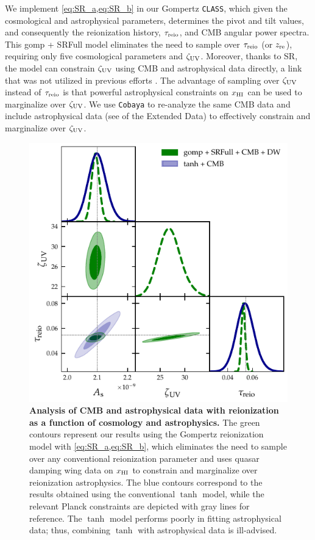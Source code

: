 We implement \cref{eq:SR_a,eq:SR_b} in our Gompertz \texttt{CLASS},
which given the cosmological and astrophysical parameters, determines
the pivot and tilt values, and consequently the reionization history,
$\tau_{\mathrm{reio}}$, and CMB angular power spectra.
This gomp + SRFull model eliminates the need to sample over $\tau_{\mathrm{reio}}$
(or $z_{\mathrm{re}}$), requiring only five cosmological parameters and $\zeta_\mathrm{UV}$.
Moreover, thanks to SR, the model can constrain $\zeta_\mathrm{UV}$ using CMB and
astrophysical data directly, a link that was not utilized in
previous efforts \cite{Greig2017}.
The advantage of sampling over $\zeta_\mathrm{UV}$ instead of $\tau_{\mathrm{reio}}$ is that
powerful astrophysical constraints on $x_{\mathrm{HI}}$ can be used to marginalize
over $\zeta_\mathrm{UV}$.
We use \texttt{Cobaya} to re-analyze the same CMB data and include
astrophysical data (see  of the Extended Data) to
effectively constrain and marginalize over $\zeta_\mathrm{UV}$.

\begin{figure}[tb]
\centering
\includegraphics[width=0.7\linewidth]{figs/gomp1dw_tanh_triangle_kill.pdf}
\caption{\textbf{Analysis of CMB and astrophysical data with
reionization as a function of cosmology and astrophysics.}
The green contours represent our results using the Gompertz reionization
model with \cref{eq:SR_a,eq:SR_b}, which eliminates the need to sample
over any conventional reionization parameter and uses quasar damping
wing data on $x_{\mathrm{HI}}$ to constrain and marginalize over reionization
astrophysics.
The blue contours correspond to the results obtained using the
conventional $\tanh$ model, while the relevant Planck constraints
\cite{Planck2020a} are depicted with gray lines for reference.
The $\tanh$ model performs poorly in fitting astrophysical data; thus,
combining $\tanh$ with astrophysical data is ill-advised.}
\label{fig:kill}
\end{figure}


